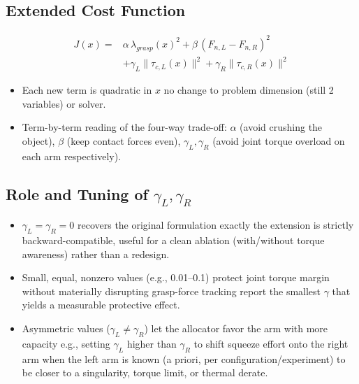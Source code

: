 \documentclass[conference]{IEEEtran}
\begin{document}
\subsection*{Extended Cost Function}

    \begin{align}
    J(x) = & \alpha\,\lambda_{grasp}(x)^2
    + \beta\,(F_{n,L}-F_{n,R})^2 \\
    &+ \gamma_L\lVert\tau_{c,L}(x)\rVert^2
    + \gamma_R\lVert\tau_{c,R}(x)\rVert^2
    \end{align}
\begin{itemize}
    \item Each new term is quadratic in \(x\) no change to problem dimension (still 2 variables) or solver.

    \item Term-by-term reading of the four-way trade-off: 
    \(\alpha\) (avoid crushing the object), 
    \(\beta\) (keep contact forces even), 
    \(\gamma_L,\gamma_R\) (avoid joint torque overload on each arm respectively).
\end{itemize}


\subsection*{Role and Tuning of $\gamma_L, \gamma_R$}
\begin{itemize}
    \item \(\gamma_L=\gamma_R=0\) recovers the original formulation exactly the extension is strictly backward-compatible, useful for a clean ablation (with/without torque awareness) rather than a redesign.

    \item Small, equal, nonzero values (e.g., 0.01--0.1) protect joint torque margin without materially disrupting grasp-force tracking report the smallest \(\gamma\) that yields a measurable protective effect.

    \item Asymmetric values (\(\gamma_L\neq\gamma_R\)) let the allocator favor the arm with more capacity e.g., setting \(\gamma_L\) higher than \(\gamma_R\) to shift squeeze effort onto the right arm when the left arm is known (a priori, per configuration/experiment) to be closer to a singularity, torque limit, or thermal derate.
\end{itemize}
\end{document}
